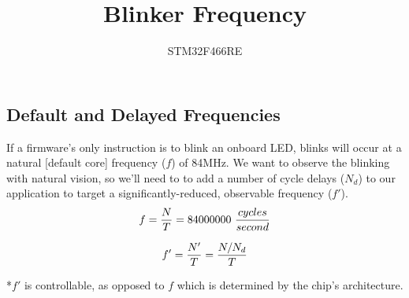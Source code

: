 \documentclass[a4paper,12pt]{article}   	%
\title{Blinker Frequency}
\author{STM32F466RE}
\begin{document}
\maketitle

\subsection*{Default and Delayed Frequencies}
\large
If a firmware's only instruction is to blink an onboard LED,
blinks will occur at a natural [default core]
frequency ($f$) of 84MHz. We want to observe the blinking 
with natural vision, so we'll need to to add a number of cycle delays 
($N_d$) to our application to target a 
significantly-reduced, observable frequency ($f'$).\\[1 ex]

$$f = \frac{N}{T} = 84000000\ \frac{cycles}{second}\\[3 ex]$$

$$f' = \frac{N'}{T} = \frac{N/N_{d}}{T} \\[3 ex]$$
\large

\normalsize
*$f'$ is controllable, as opposed to $f$ which is determined by the chip's architecture.
\end{document}

